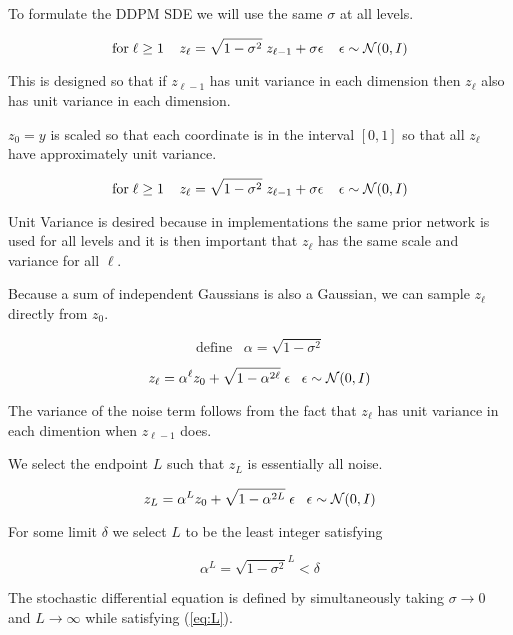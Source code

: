 {

To formulate the DDPM SDE we will use the same $\sigma$ at all levels.

$$\mathrm{for}\;\ell \geq 1\;\;\;\;z_\ell = \sqrt{1-\sigma^2}\;z_{\ell-1} + \sigma \epsilon\;\;\;\;\epsilon \sim {\cal N}(0,I)$$

\vfill
This is designed so that if $z_{\ell-1}$ has unit variance in each dimension then $z_{\ell}$ also has unit variance in each dimension.

\vfill
$z_0 = y$ is scaled so that each coordinate is in the interval $[0,1]$ so that all $z_\ell$ have approximately unit variance.


$$\mathrm{for}\;\ell \geq 1\;\;\;\;z_\ell = \sqrt{1-\sigma^2}\;z_{\ell-1} + \sigma \epsilon\;\;\;\;\epsilon \sim {\cal N}(0,I)$$

\vfill
Unit Variance is desired because in implementations the same prior network is used
for all levels and it is then important that $z_\ell$ has the same scale and variance for all $\ell$.


Because a sum of independent Gaussians is also a Gaussian, we can sample $z_{\ell}$ directly from $z_0$.

$$\mathrm{define}\;\;\;\alpha = \sqrt{1-\sigma^2}$$

\vfill
$$z_{\ell} = \alpha^\ell z_0 + \sqrt{1-\alpha^{2\ell}} \;\epsilon\;\;\;\epsilon \sim {\cal N}(0,I)$$

\vfill
The variance of the noise term follows from the fact that $z_{\ell}$ has unit variance in each dimention when $z_{\ell-1}$ does.


We select the endpoint $L$ such that $z_L$ is essentially all noise.

$$z_{L} = \alpha^L z_0 + \sqrt{1-\alpha^{2L}} \;\epsilon\;\;\;\epsilon \sim {\cal N}(0,I)$$

\vfill
For some limit $\delta$ we select $L$ to be the least integer satisfying

\begin{equation}
\label{eq:L}
\alpha^L = \sqrt{1-\sigma^2}^L < \delta
\end{equation}

\vfill
The stochastic differential equation is defined by simultaneously taking $\sigma \rightarrow 0$ and $L \rightarrow \infty$ while satisfying (\ref{eq:L}).

}
